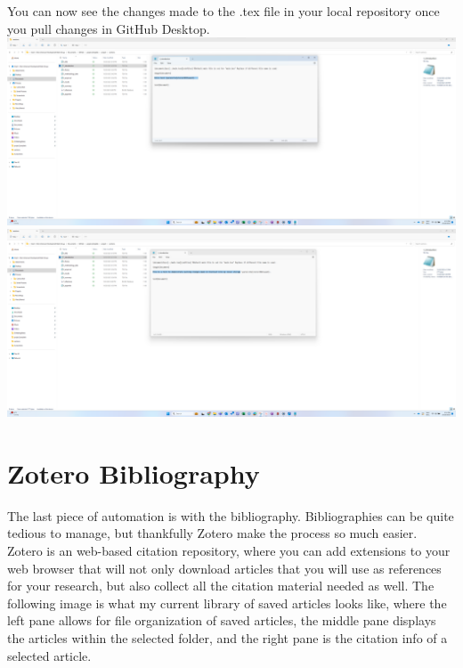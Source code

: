 \documentclass[12pt]{article}
\begin{document}
You can now see the changes made to the .tex file in your local repository once you pull changes in GitHub Desktop. \\

\includegraphics[width=1\textwidth]{Instructions/project_template_screenshots/project_template_31.png} \\

\includegraphics[width=1\textwidth]{Instructions/project_template_screenshots/project_template_33.png} \\

\section{Zotero Bibliography}

The last piece of automation is with the bibliography. Bibliographies can be quite tedious to manage, but thankfully Zotero make the process so much easier. Zotero is an web-based citation repository, where you can add extensions to your web browser that will not only download articles that you will use as references for your research, but also collect all the citation material needed as well. The following image is what my current library of saved articles looks like, where the left pane allows for file organization of saved articles, the middle pane displays the articles within the selected folder, and the right pane is the citation info of a selected article. \\
\end{document}
